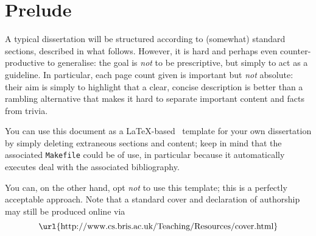 \documentclass[ %
                    author={Gavin Parker},
                supervisor={Dr. Neill Campbell},
                    degree={MEng},
                     title={Deep Siamese Networks for Illumination Estimation from Stereo Images},
                  subtitle={},
                      type={research},
                      year={2018} ]{dissertation}
\begin{document}


\section*{Prelude}
\thispagestyle{empty}

A typical dissertation will be structured according to (somewhat) standard 
sections, described in what follows.  However, it is hard and perhaps even 
counter-productive to generalise: the goal is {\em not} to be prescriptive, 
but simply to act as a guideline.  In particular, each page count given is
important but {\em not} absolute: their aim is simply to highlight that a 
clear, concise description is better than a rambling alternative that makes
it hard to separate important content and facts from trivia.

You can use this document as a \LaTeX-based~\cite{latexbook1,latexbook2} 
template for your own dissertation by simply deleting extraneous sections
and content; keep in mind that the associated {\tt Makefile} could be of
use, in particular because it automatically executes %
deal with the associated bibliography.  

You can, on the other hand, opt {\em not} to use this template; this is a 
perfectly acceptable approach.  Note that a standard cover and declaration 
of authorship may still be produced online via
\[
\mbox{\url{http://www.cs.bris.ac.uk/Teaching/Resources/cover.html}}
\]



\maketitle

\end{document}
